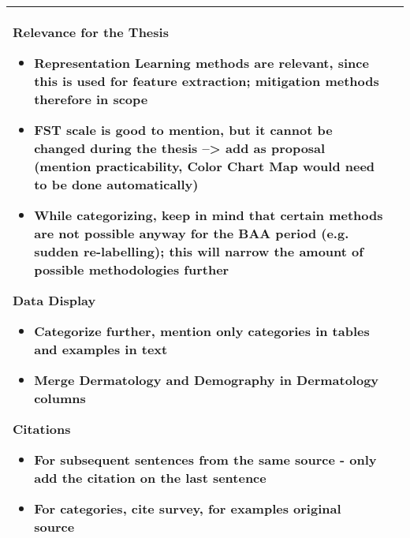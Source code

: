 \documentclass[a4paper,11pt]{article}
\begin{document}
\begin{longtable}{|p{3.5cm}|p{12cm}|}
		Relevance for the Thesis
		\begin{itemize}
			\item Representation Learning methods are relevant, since this is used for feature extraction; mitigation methods therefore in scope
			\item FST scale is good to mention, but it cannot be changed during the thesis --> add as proposal (mention practicability, Color Chart Map would need to be done automatically)
			\item While categorizing, keep in mind that certain methods are not possible anyway for the BAA period (e.g. sudden re-labelling); this will narrow the amount of possible methodologies further
		\end{itemize}
		
		Data Display
		\begin{itemize}
		\item Categorize further, mention only categories in tables and examples in text
		\item Merge Dermatology and Demography in Dermatology columns
		
		\end{itemize}
		
		Citations
		\begin{itemize}
		\item For subsequent sentences from the same source - only add the citation on the last sentence 
		\item For categories, cite survey, for examples original source
		\end{itemize} \\
		\hline
	\end{longtable}
	
\end{document}
